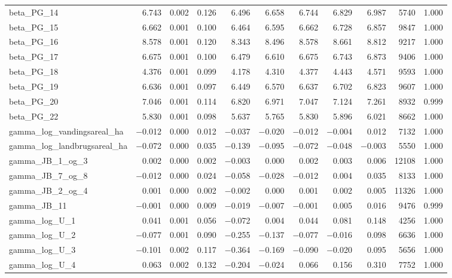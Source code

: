 \documentclass[12pt]{article}
\begin{document}
\begin{longtable}{lrrrrrrrrrr}
beta\_PG\_14 &  6.743 & 0.002 & 0.126 &  6.496 &  6.658 &  6.744 &  6.829 &  6.987 &  5740 & 1.000 \\
beta\_PG\_15 &  6.662 & 0.001 & 0.100 &  6.464 &  6.595 &  6.662 &  6.728 &  6.857 &  9847 & 1.000 \\
beta\_PG\_16 &  8.578 & 0.001 & 0.120 &  8.343 &  8.496 &  8.578 &  8.661 &  8.812 &  9217 & 1.000 \\
beta\_PG\_17 &  6.675 & 0.001 & 0.100 &  6.479 &  6.610 &  6.675 &  6.743 &  6.873 &  9406 & 1.000 \\
beta\_PG\_18 &  4.376 & 0.001 & 0.099 &  4.178 &  4.310 &  4.377 &  4.443 &  4.571 &  9593 & 1.000 \\
beta\_PG\_19 &  6.636 & 0.001 & 0.097 &  6.449 &  6.570 &  6.637 &  6.702 &  6.823 &  9607 & 1.000 \\
beta\_PG\_20 &  7.046 & 0.001 & 0.114 &  6.820 &  6.971 &  7.047 &  7.124 &  7.261 &  8932 & 0.999 \\
beta\_PG\_22 &  5.830 & 0.001 & 0.098 &  5.637 &  5.765 &  5.830 &  5.896 &  6.021 &  8662 & 1.000 \\
\addlinespace
gamma\_log\_vandingsareal\_ha  & $-$0.012 & 0.000 & 0.012 & $-$0.037 & $-$0.020 & $-$0.012 & $-$0.004 &  0.012 &  7132 & 1.000 \\
gamma\_log\_landbrugsareal\_ha & $-$0.072 & 0.000 & 0.035 & $-$0.139 & $-$0.095 & $-$0.072 & $-$0.048 & $-$0.003 &  5550 & 1.000 \\
gamma\_JB\_1\_og\_3  &  0.002 & 0.000 & 0.002 & $-$0.003 &  0.000 &  0.002 &  0.003 &  0.006 & 12108 & 1.000 \\
gamma\_JB\_7\_og\_8  & $-$0.012 & 0.000 & 0.024 & $-$0.058 & $-$0.028 & $-$0.012 &  0.004 &  0.035 &  8133 & 1.000 \\
gamma\_JB\_2\_og\_4  &  0.001 & 0.000 & 0.002 & $-$0.002 &  0.000 &  0.001 &  0.002 &  0.005 & 11326 & 1.000 \\
gamma\_JB\_11        & $-$0.001 & 0.000 & 0.009 & $-$0.019 & $-$0.007 & $-$0.001 &  0.005 &  0.016 &  9476 & 0.999 \\
gamma\_log\_U\_1  &  0.041 & 0.001 & 0.056 & $-$0.072 &  0.004 &  0.044 &  0.081 &  0.148 &  4256 & 1.000 \\
gamma\_log\_U\_2  & $-$0.077 & 0.001 & 0.090 & $-$0.255 & $-$0.137 & $-$0.077 & $-$0.016 &  0.098 &  6636 & 1.000 \\
gamma\_log\_U\_3  & $-$0.101 & 0.002 & 0.117 & $-$0.364 & $-$0.169 & $-$0.090 & $-$0.020 &  0.095 &  5656 & 1.000 \\
gamma\_log\_U\_4  &  0.063 & 0.002 & 0.132 & $-$0.204 & $-$0.024 &  0.066 &  0.156 &  0.310 &  7752 & 1.000 \\

\end{longtable}
\end{document}
